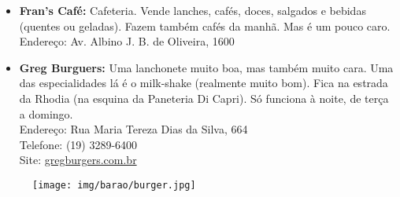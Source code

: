 \begin{itemize}
    \item   \textbf{Fran's Café:} Cafeteria. Vende lanches, cafés, doces,
        salgados e bebidas (quentes ou geladas). Fazem também cafés da manhã.
        Mas é um pouco caro.
        \\Endereço: Av. Albino J. B. de Oliveira, 1600 

    \item   \textbf{Greg Burguers:} Uma lanchonete muito boa, mas também muito
        cara.  Uma das especialidades lá é o milk-shake (realmente muito bom).
        Fica na estrada da Rhodia (na esquina da Paneteria Di Capri). Só
        funciona à noite, de terça a domingo.
        \\Endereço: Rua Maria Tereza Dias da Silva, 664
        \\Telefone: (19) 3289-6400
        \\Site: \url{gregburgers.com.br}
\end{itemize}

\begin{figure}[h!]
    \centering
    \texttt{[image: img/barao/burger.jpg]}
\end{figure}

